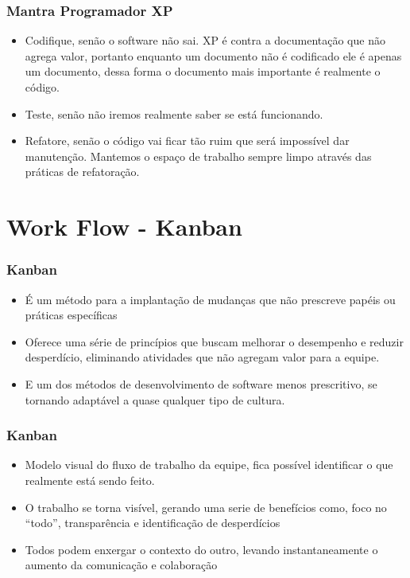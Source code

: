\begin{frame}
 \frametitle{Mantra Programador XP}
 \begin{itemize}
\item Codifique, senão o software não sai. XP é contra a documentação que não agrega valor, portanto enquanto um documento não é codificado ele é apenas um documento, dessa forma o documento mais importante é realmente o código.
\item Teste, senão não iremos realmente saber se está funcionando.
\item Refatore, senão o código vai ficar tão ruim que será impossível dar manutenção. Mantemos o espaço de trabalho sempre limpo através das práticas de refatoração.
 \end{itemize}

\end{frame}

\section{Work Flow - Kanban}
\begin{frame}
 \frametitle{Kanban}
  \begin{itemize}
  \item É um método para a implantação de mudanças que não prescreve papéis ou práticas específicas
  \item Oferece uma série de princípios que buscam melhorar o desempenho e reduzir desperdício, eliminando atividades que não agregam valor para a equipe.
  \item E um dos métodos de desenvolvimento de software menos prescritivo, se tornando adaptável a quase qualquer tipo de cultura.
 \end{itemize}
\end{frame}

\begin{frame}
 \frametitle{Kanban}
  \begin{itemize}
  \item Modelo visual do fluxo de trabalho da equipe, fica possível identificar o que realmente está sendo feito.
  \item O trabalho se torna visível, gerando uma serie de benefícios como, foco no “todo”, transparência e identificação de desperdícios
  \item Todos podem enxergar o contexto do outro, levando instantaneamente o aumento da comunicação e colaboração
 \end{itemize}
\end{frame}


